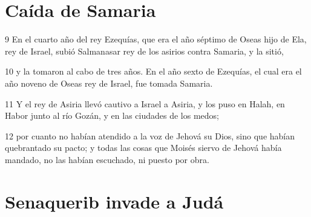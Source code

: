 \section*{Caída de Samaria}

\par 9 En el cuarto año del rey Ezequías, que era el año séptimo de Oseas hijo de Ela, rey de Israel, subió Salmanasar rey de los asirios contra Samaria, y la sitió,
\par 10 y la tomaron al cabo de tres años. En el año sexto de Ezequías, el cual era el año noveno de Oseas rey de Israel, fue tomada Samaria.
\par 11 Y el rey de Asiria llevó cautivo a Israel a Asiria, y los puso en Halah, en Habor junto al río Gozán, y en las ciudades de los medos;
\par 12 por cuanto no habían atendido a la voz de Jehová su Dios, sino que habían quebrantado su pacto; y todas las cosas que Moisés siervo de Jehová había mandado, no las habían escuchado, ni puesto por obra.

\section*{Senaquerib invade a Judá}

